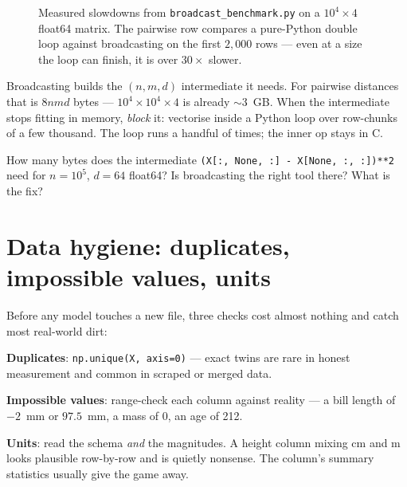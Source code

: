 \begin{figure}[ht]\centering
{}
\caption{Measured slowdowns from \texttt{broadcast\_benchmark.py} on a
$10^4\times4$ float64 matrix. The pairwise row compares a pure-Python double
loop against broadcasting on the first $2{,}000$ rows --- even at a size the
loop can finish, it is over $30\times$ slower.}\label{fig:timing}
\end{figure}

\begin{rulebox}
Broadcasting builds the $(n,m,d)$ intermediate it needs. For pairwise
distances that is $8nmd$ bytes --- $10^4\times10^4\times4$ is already
$\sim$3~GB. When the intermediate stops fitting in memory, \emph{block} it:
vectorise inside a Python loop over row-chunks of a few thousand. The loop
runs a handful of times; the inner op stays in C.
\end{rulebox}

\begin{checkpoint}
How many bytes does the intermediate \texttt{(X[:, None, :] - X[None, :,
:])**2} need for $n=10^5$, $d=64$ float64? Is broadcasting the right tool
there? What is the fix?
\end{checkpoint}

\section{Data hygiene: duplicates, impossible values, units}\label{sec:hygiene}

Before any model touches a new file, three checks cost almost nothing and
catch most real-world dirt:

\begin{checklist}
\item \textbf{Duplicates}: \texttt{np.unique(X, axis=0)} --- exact twins are
  rare in honest measurement and common in scraped or merged data.
\item \textbf{Impossible values}: range-check each column against reality ---
  a bill length of $-2$~mm or $97.5$~mm, a mass of 0, an age of 212.
\item \textbf{Units}: read the schema \emph{and} the magnitudes. A height
  column mixing cm and m looks plausible row-by-row and is quietly nonsense.
  The column's summary statistics usually give the game away.
\end{checklist}

